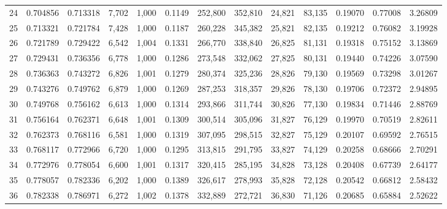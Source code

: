 \begin{tabular}{rrrrrrrrrrrrr}
24  &  0.704856 &  0.713318 &   7,702 &  1,000 &                                     0.1149 &  252,800 &  352,810 &   24,821 &   83,135 &  0.19070 &  0.77008 &  3.26809 \\
25  &  0.713321 &  0.721784 &   7,428 &  1,000 &                                     0.1187 &  260,228 &  345,382 &   25,821 &   82,135 &  0.19212 &  0.76082 &  3.19928 \\
26  &  0.721789 &  0.729422 &   6,542 &  1,004 &                                     0.1331 &  266,770 &  338,840 &   26,825 &   81,131 &  0.19318 &  0.75152 &  3.13869 \\
27  &  0.729431 &  0.736356 &   6,778 &  1,000 &                                     0.1286 &  273,548 &  332,062 &   27,825 &   80,131 &  0.19440 &  0.74226 &  3.07590 \\
28  &  0.736363 &  0.743272 &   6,826 &  1,001 &                                     0.1279 &  280,374 &  325,236 &   28,826 &   79,130 &  0.19569 &  0.73298 &  3.01267 \\
29  &  0.743276 &  0.749762 &   6,879 &  1,000 &                                     0.1269 &  287,253 &  318,357 &   29,826 &   78,130 &  0.19706 &  0.72372 &  2.94895 \\
30  &  0.749768 &  0.756162 &   6,613 &  1,000 &                                     0.1314 &  293,866 &  311,744 &   30,826 &   77,130 &  0.19834 &  0.71446 &  2.88769 \\
31  &  0.756164 &  0.762371 &   6,648 &  1,001 &                                     0.1309 &  300,514 &  305,096 &   31,827 &   76,129 &  0.19970 &  0.70519 &  2.82611 \\
32  &  0.762373 &  0.768116 &   6,581 &  1,000 &                                     0.1319 &  307,095 &  298,515 &   32,827 &   75,129 &  0.20107 &  0.69592 &  2.76515 \\
33  &  0.768117 &  0.772966 &   6,720 &  1,000 &                                     0.1295 &  313,815 &  291,795 &   33,827 &   74,129 &  0.20258 &  0.68666 &  2.70291 \\
34  &  0.772976 &  0.778054 &   6,600 &  1,001 &                                     0.1317 &  320,415 &  285,195 &   34,828 &   73,128 &  0.20408 &  0.67739 &  2.64177 \\
35  &  0.778057 &  0.782336 &   6,202 &  1,000 &                                     0.1389 &  326,617 &  278,993 &   35,828 &   72,128 &  0.20542 &  0.66812 &  2.58432 \\
36  &  0.782338 &  0.786971 &   6,272 &  1,002 &                                     0.1378 &  332,889 &  272,721 &   36,830 &   71,126 &  0.20685 &  0.65884 &  2.52622 \\

\end{tabular}
